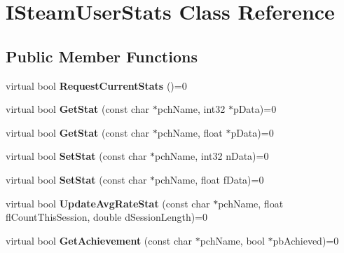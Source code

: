 \hypertarget{classISteamUserStats}{}\section{I\+Steam\+User\+Stats Class Reference}
\label{classISteamUserStats}
\subsection*{Public Member Functions}
\begin{DoxyCompactItemize}
\item 
\hypertarget{classISteamUserStats_abb2ea3bbab0b6a49b82f3909e8a607e4}{}virtual bool {\bfseries Request\+Current\+Stats} ()=0\label{classISteamUserStats_abb2ea3bbab0b6a49b82f3909e8a607e4}

\item 
\hypertarget{classISteamUserStats_a66735bcffab97ea09ababd2612373ab0}{}virtual bool {\bfseries Get\+Stat} (const char $\ast$pch\+Name, int32 $\ast$p\+Data)=0\label{classISteamUserStats_a66735bcffab97ea09ababd2612373ab0}

\item 
\hypertarget{classISteamUserStats_aa0596845bd059b035921df15fa44f2f3}{}virtual bool {\bfseries Get\+Stat} (const char $\ast$pch\+Name, float $\ast$p\+Data)=0\label{classISteamUserStats_aa0596845bd059b035921df15fa44f2f3}

\item 
\hypertarget{classISteamUserStats_a37327970ed85b6f377d537ca2d7e35e7}{}virtual bool {\bfseries Set\+Stat} (const char $\ast$pch\+Name, int32 n\+Data)=0\label{classISteamUserStats_a37327970ed85b6f377d537ca2d7e35e7}

\item 
\hypertarget{classISteamUserStats_a2e09f8c4ea8f57cdb5641f86752633af}{}virtual bool {\bfseries Set\+Stat} (const char $\ast$pch\+Name, float f\+Data)=0\label{classISteamUserStats_a2e09f8c4ea8f57cdb5641f86752633af}

\item 
\hypertarget{classISteamUserStats_a67dc594db3f8e73f78e9c48df2f2ddba}{}virtual bool {\bfseries Update\+Avg\+Rate\+Stat} (const char $\ast$pch\+Name, float fl\+Count\+This\+Session, double d\+Session\+Length)=0\label{classISteamUserStats_a67dc594db3f8e73f78e9c48df2f2ddba}

\item 
\hypertarget{classISteamUserStats_aeba9299bfdc1c7d8eeef8ab1995085c3}{}virtual bool {\bfseries Get\+Achievement} (const char $\ast$pch\+Name, bool $\ast$pb\+Achieved)=0\label{classISteamUserStats_aeba9299bfdc1c7d8eeef8ab1995085c3}


\end{DoxyCompactItemize}
